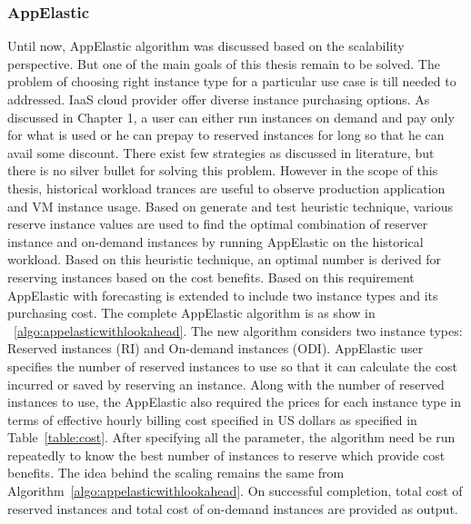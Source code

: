 \subsubsection{AppElastic}
\label{subs:AppElastic}
Until now, AppElastic algorithm was discussed based on the scalability perspective. But one of the main goals of this thesis remain to be solved. The problem of choosing right instance type for a particular use case is till needed to addressed.  IaaS cloud provider offer diverse instance purchasing options. As discussed in Chapter 1, a user can either run instances on demand and pay only for what is used or he can prepay to reserved instances for long so that he can avail some discount. There  exist few strategies as discussed in literature\cite{wang2013reserve}, but there is no silver bullet for solving this problem. However in the scope of this thesis, historical workload trances are useful to observe production application and VM instance usage. Based on generate and test heuristic technique, various reserve instance values are used to find the optimal combination of reserver instance and on-demand instances by running AppElastic on the historical workload. Based on this heuristic technique, an optimal number is derived for reserving instances based on the cost benefits. Based on this requirement AppElastic with forecasting is extended to include two instance types and its purchasing cost. The complete AppElastic algorithm is as show in ~\ref{algo:appelasticwithlookahead}. The new algorithm considers two instance types: Reserved instances (RI) and On-demand instances (ODI). AppElastic user specifies the number of reserved instances to use so that it can calculate the cost incurred or saved by reserving an instance. Along with the number of reserved instances to use, the AppElastic also required the prices for each instance type in terms of effective hourly billing cost specified in US dollars as specified in Table~\ref{table:cost}. After specifying all the parameter, the algorithm need be run repeatedly to know the best number of instances to reserve which provide cost benefits. The idea behind the scaling remains the same from Algorithm~\ref{algo:appelasticwithlookahead}. On successful completion, total cost of reserved instances and total cost of on-demand instances are provided as output.


